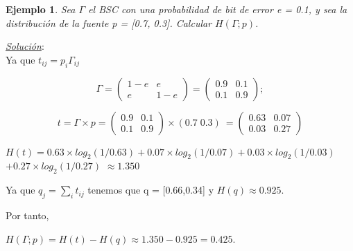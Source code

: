 \documentclass{beamer}
\theoremstyle{plain}
\theoremstyle{example}
\theoremstyle{example}
\newtheorem{ejemplo} [Ejemplo] {Ejemplo}
\begin{document}
\begin{frame}  \small 

\begin{ejemplo}

Sea $\Gamma$ el BSC con una probabilidad de bit de error  e = 0.1, y sea la distribución de la fuente p = [0.7, 0.3]. Calcular $H (\Gamma ; p)$.\\

\end{ejemplo}


\textit{\underline{Solución}}:\\
\vspace{0.5cm}
Ya que $t_{ij} = p_i \Gamma_{ij}$ 

\[
\Gamma =  \left( \begin{array}{cc}
           1-e       & e      \\
            e    & 1-e      
           \end{array}
    \right) =  \left( \begin{array}{cc}
           0.9       & 0.1     \\
            0.1    & 0.9      
           \end{array}
    \right) ;
\]

\[
 t = \Gamma \times p = 
     \left( \begin{array}{cc}
           0.9       & 0.1     \\
            0.1    & 0.9      
           \end{array}
    \right) \times (0.7 \; 0.3) \  = 
     \left( \begin{array}{cc}
            0.63     & 0.07     \\
            0.03    & 0.27      
           \end{array}
    \right)
\]
\vspace{0.3cm}

$H(t) = 0.63 \times log_2(1/0.63)+ 0.07 \times log_2(1/0.07) + 0.03 \times log_2(1/0.03)$ $ + 0.27 \times log_2(1/0.27)$ $\approx 1.350$
\vspace{0.3cm}

Ya que $q_j = \sum_i t_{ij}$ tenemos que q = [0.66,0.34] y $H(q) \approx 0.925$. 

\vspace{0.2cm}
Por tanto, 
\begin{center}
$H (\Gamma ; p) = H (t) - H (q) \approx 1.350 - 0.925 = 0.425.$
\end{center}




\end{frame} 
\end{document}
